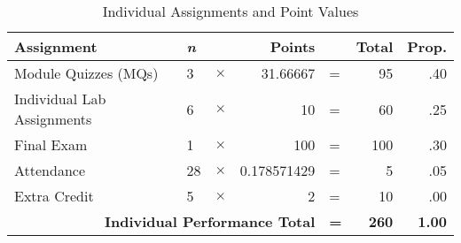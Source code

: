 \documentclass[article]{article}
\begin{document}
\begin{table}[H]
\centering
\caption{Individual Assignments and Point Values}
\vspace{3mm}
\label{points}
\begin{tabular}{lllrlrr}
\hline
\bf{Assignment} & \bf{\em{n}} &  & \bf{Points} &  & \bf{Total} & \bf{Prop.} \\
\hline
Module Quizzes (MQs) & 3 & $\times$ & 31.66667 & = & 95 & .40\\
Individual Lab Assignments & 6 & $\times$ & 10 & = & 60 & .25 \\
Final Exam & 1 & $\times$ & 100 & = & 100 & .30 \\
Attendance & 28 & $\times$ & 0.178571429 & = & 5 & .05 \\
Extra Credit & 5 & $\times$ & 2 & = & 10 & .00 \\
\multicolumn{4}{r}{\bf{Individual Performance Total}} & {\bf{=}} & {\bf{260}} & {\bf{1.00}} \\
%
\hline
\end{tabular}
\label{points}
\end{table}
\end{document}
